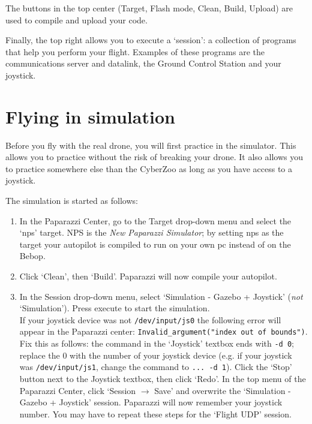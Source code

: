 \documentclass{article}
\begin{document}
The buttons in the top center (Target, Flash mode, Clean, Build, Upload) are used to compile and upload your code.

Finally, the top right allows you to execute a `session': a collection of programs that help you perform your flight. Examples of these programs are the communications server and datalink, the Ground Control Station and your joystick.



\section{Flying in simulation}
Before you fly with the real drone, you will first practice in the simulator.
This allows you to practice without the risk of breaking your drone. It also allows you to practice somewhere else than the CyberZoo as long as you have access to a joystick.

\medskip
The simulation is started as follows:
\begin{enumerate}
\item In the Paparazzi Center, go to the Target drop-down menu and select the `nps' target. NPS is the \emph{New Paparazzi Simulator}; by setting nps as the target your autopilot is compiled to run on your own pc instead of on the Bebop.
\item Click `Clean', then `Build'. Paparazzi will now compile your autopilot.
\item In the Session drop-down menu, select `Simulation - Gazebo + Joystick' (\emph{not} `Simulation'). Press execute to start the simulation.\smallskip\\
If your joystick device was not \verb"/dev/input/js0" the following error will appear in the Paparazzi center: \verb|Invalid_argument("index out of bounds")|. Fix this as follows: the command in the `Joystick' textbox ends with \verb"-d 0"; replace the 0 with the number of your joystick device (e.g. if your joystick was \verb"/dev/input/js1", change the command to \verb"... -d 1"). Click the `Stop' button next to the Joystick textbox, then click `Redo'. In the top menu of the Paparazzi Center, click `Session $\rightarrow$ Save' and overwrite the `Simulation - Gazebo + Joystick' session. Paparazzi will now remember your joystick number. You may have to repeat these steps for the `Flight UDP' session.
\end{enumerate}
\end{document}
